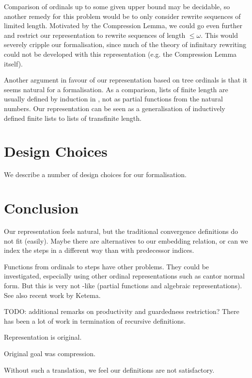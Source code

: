 Comparison of ordinals up to some given upper bound may be decidable,
so another remedy for this problem would be to only consider rewrite
sequences of limited length. Motivated by the Compression Lemma, we
could go even further and restrict our representation to rewrite
sequences of length $\le \omega$. This would severely cripple our
formalisation, since much of the theory of infinitary rewriting could
not be developed with this representation (e.g. the Compression Lemma
itself). %

Another argument in favour of our representation based on tree
ordinals is that it seems natural for a \Coq formalisation. As a
comparison, lists of finite length are usually defined by induction in
\Coq, not as partial functions from the natural numbers. Our
representation can be seen as a generalisation of inductively defined
finite lists to lists of transfinite length.


\section{Design Choices}

We describe a number of design choices for our formalisation.









\section{Conclusion}

Our representation feels natural, but the traditional convergence
definitions do not fit (easily). Maybe there are alternatives to our
embedding relation, or can we index the steps in a different way than
with predecessor indices.

Functions from ordinals to steps have other problems. They could be
investigated, especially using other ordinal representations such as
cantor normal form. But this is very not \Coq-like (partial functions
and algebraic representations). See also recent work by Ketema.

TODO: additional remarks on productivity and guardedness restriction?
There has been a lot of work in termination of recursive definitions.

Representation is original.

Original goal was compression.

Without such a translation, we feel our definitions are not
satisfactory.
